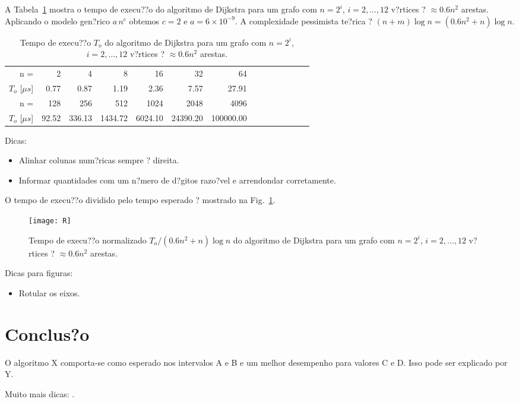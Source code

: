 \documentclass{article}
\begin{document}
A Tabela~\ref{tab1} mostra o tempo de execu??o do algoritmo de Dijkstra para um grafo com $n=2^i$,
$i=2,\ldots,12$ v?rtices ? $\approx 0.6n^2$ arestas. Aplicando o modelo gen?rico $a\,n^c$ obtemos $c=2$ e
$a=6\times 10^{-9}$. A complexidade pessimista te?rica ? $(n+m)\log n=(0.6n^2+n)\log n$.


\begin{table}
  \centering
  \begin{tabular}{rrrrrrrrrrrrrr}
    \hline
    n =             & 2     & 4      & 8       & 16      & 32       & 64        \\
    $T_o$ [$\mu s$] & 0.77  & 0.87   & 1.19    & 2.36    & 7.57     & 27.91     \\
    \hline
    n =             & 128   & 256    & 512     & 1024    & 2048     & 4096      \\
    $T_o$ [$\mu s$] & 92.52 & 336.13 & 1434.72 & 6024.10 & 24390.20 & 100000.00 \\
    \hline
  \end{tabular}
  \caption{Tempo de execu??o $T_o$ do algoritmo de Dijkstra para um grafo com
    $n=2^i$, $i=2,\ldots,12$ v?rtices ? $\approx 0.6n^2$ arestas.}
  \label{tab1}
\end{table}

\begin{shaded}
  Dicas:
  \begin{itemize}
  \item Alinhar colunas num?ricas sempre ? direita.
  \item Informar quantidades com um n?mero de d?gitos razo?vel e arrendondar corretamente.
  \end{itemize}
\end{shaded}

O tempo de execu??o dividido pelo tempo esperado ? mostrado na Fig.~\ref{fig1}.

\begin{figure}
  \centering
  \texttt{[image: R]}
  \caption{Tempo de execu??o normalizado $T_o/(0.6n^2+n)\log n$ do algoritmo de Dijkstra para um grafo com
    $n=2^i$, $i=2,\ldots,12$ v?rtices ? $\approx 0.6n^2$ arestas.}
  \label{fig1}
\end{figure}

\begin{shaded}
  Dicas para figuras:
  \begin{itemize}
  \item Rotular os eixos.
  \end{itemize}

\end{shaded}

\section{Conclus?o}

O algoritmo X comporta-se como esperado nos intervalos A e B e um melhor desempenho para valores C e D. Isso
pode ser explicado por Y.

\begin{shaded}
  Muito mais dicas: \textcite{Johnson/2002}.
\end{shaded}

\printbibliography
\end{document}
